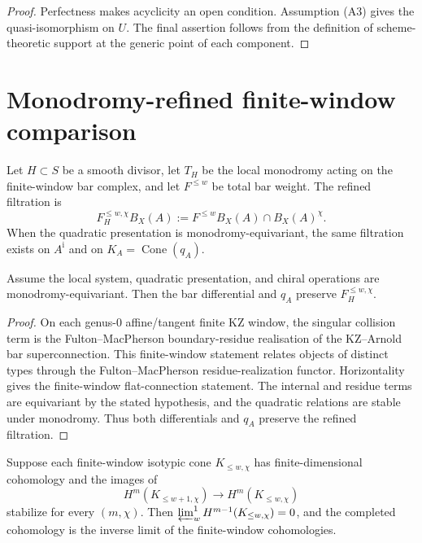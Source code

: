 \begin{proof}
Perfectness makes acyclicity an open condition.  Assumption
\textup{(A3)} gives the quasi-isomorphism on \(U\).  The final
assertion follows from the definition of scheme-theoretic support at
the generic point of each component.
\end{proof}

\section{Monodromy-refined finite-window comparison}
\label{sec:tbsp-strict-across-humbert-walls}

\begin{definition}
\label{def:monodromy-refined-total-bar-weight}
Let \(H\subset S\) be a smooth divisor, let \(T_H\) be the local
monodromy acting on the finite-window bar complex, and let
\(F^{\leq w}\) be total bar weight.  The refined filtration is
\[
 F^{\leq w,\chi}_H B_X(A)
 :=
 F^{\leq w}B_X(A)\cap B_X(A)^\chi .
\]
When the quadratic presentation is monodromy-equivariant, the same
filtration exists on \(A^{\mathrm i}\) and on
\(K_A=\operatorname{Cone}(q_A)\).
\end{definition}

\begin{lemma}
\label{lem:bar-differential-preserves-monodromy-filtration}
Assume the local system, quadratic presentation, and chiral
operations are monodromy-equivariant.  Then the bar differential and
\(q_A\) preserve \(F^{\leq w,\chi}_H\).
\end{lemma}

\begin{proof}
On each genus-\(0\) affine/tangent finite KZ window, the singular
collision term is the Fulton--MacPherson boundary-residue realisation
of the KZ--Arnold bar superconnection.  This finite-window statement
relates objects of distinct types through the Fulton--MacPherson
residue-realization functor.  Horizontality gives the
finite-window flat-connection statement.  The internal and residue
terms are equivariant by the stated hypothesis, and the quadratic
relations are stable under monodromy.  Thus both differentials and
\(q_A\) preserve the refined filtration.
\end{proof}

\begin{lemma}
\label{lem:per-isotypic-ML-Hn}
Suppose each finite-window isotypic cone
\(K_{\leq w,\chi}\) has finite-dimensional cohomology and the images
of
\[
 H^m(K_{\leq w+1,\chi})\longrightarrow
 H^m(K_{\leq w,\chi})
\]
stabilize for every \((m,\chi)\).  Then
\(\varprojlim^1_wH^{m-1}(K_{\leq w,\chi})=0\), and the completed
cohomology is the inverse limit of the finite-window cohomologies.
\end{lemma}

